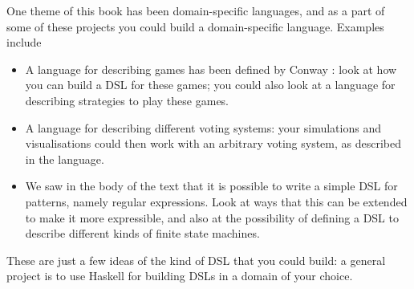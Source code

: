 One theme of this book has been domain-specific languages, and as a part of some of these projects you could build a domain-specific language. Examples include
\begin{itemize}
\item
A language for describing games has been defined by Conway \cite{conwayGames,winningWays}: look at how you can build a DSL for these games; you could also look at a language for describing strategies to play these games.
\item
A language for describing different voting systems: your simulations and visualisations could then work with an arbitrary voting system, as described in the language.
\item
We saw in the body of the text that it is possible to write a simple DSL for patterns, namely regular expressions. Look at ways that this can be extended to make it more expressible, and also at the possibility of defining a DSL to describe different kinds of finite state machines.
\end{itemize} 
These are just a few ideas of the kind of DSL that you could build: a general project is to use Haskell for building DSLs in a domain of your choice.




